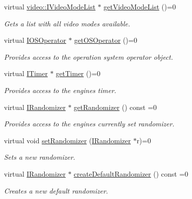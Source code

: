 \begin{DoxyCompactItemize}
virtual \hyperlink{classirr_1_1video_1_1IVideoModeList}{video\+::\+I\+Video\+Mode\+List} $\ast$ \hyperlink{classirr_1_1IrrlichtDevice_a8872867a5ad728a4673679e9e8f469e7}{get\+Video\+Mode\+List} ()=0
\begin{DoxyCompactList}\small\item\em Gets a list with all video modes available. \end{DoxyCompactList}\item 
virtual \hyperlink{classirr_1_1IOSOperator}{I\+O\+S\+Operator} $\ast$ \hyperlink{classirr_1_1IrrlichtDevice_a3833250e8b0d7a94cd34b1e1809033ac}{get\+O\+S\+Operator} ()=0
\begin{DoxyCompactList}\small\item\em Provides access to the operation system operator object. \end{DoxyCompactList}\item 
virtual \hyperlink{classirr_1_1ITimer}{I\+Timer} $\ast$ \hyperlink{classirr_1_1IrrlichtDevice_a96c30fb7f644e1d1dabff563bde26460}{get\+Timer} ()=0
\begin{DoxyCompactList}\small\item\em Provides access to the engine\textquotesingle{}s timer. \end{DoxyCompactList}\item 
virtual \hyperlink{classirr_1_1IRandomizer}{I\+Randomizer} $\ast$ \hyperlink{classirr_1_1IrrlichtDevice_aaba0cb18cac48e381d841ad763c7ea8b}{get\+Randomizer} () const =0
\begin{DoxyCompactList}\small\item\em Provides access to the engine\textquotesingle{}s currently set randomizer. \end{DoxyCompactList}\item 
virtual void \hyperlink{classirr_1_1IrrlichtDevice_af996a8a8031dacd823e3c65ee3ed2c33}{set\+Randomizer} (\hyperlink{classirr_1_1IRandomizer}{I\+Randomizer} $\ast$r)=0
\begin{DoxyCompactList}\small\item\em Sets a new randomizer. \end{DoxyCompactList}\item 
virtual \hyperlink{classirr_1_1IRandomizer}{I\+Randomizer} $\ast$ \hyperlink{classirr_1_1IrrlichtDevice_a267b069ea2c5f5b008fd7afa5b931ee9}{create\+Default\+Randomizer} () const =0
\begin{DoxyCompactList}\small\item\em Creates a new default randomizer. \end{DoxyCompactList}\item 

\end{DoxyCompactItemize}
